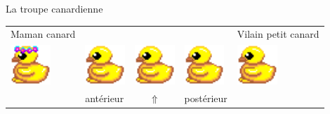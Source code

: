 \documentclass[table]{beamer}
\begin{document}
\begin{frame}{La troupe canardienne}

    \begin{center}
    \begin{tabular}{p{1.5cm}p{1.5cm}c p{1.5cm}p{1.5cm}}
        Maman canard &&&& \footnotesize Vilain petit canard \\
        \includegraphics[width=1.5cm]{img/sprite/ducks/duck_W_1.png} &
        \includegraphics[width=1.5cm]{img/sprite/ducks/duckling_W_1.png} &
        \includegraphics[width=1.5cm]{img/sprite/ducks/duckling_W_1.png} &
        \includegraphics[width=1.5cm]{img/sprite/ducks/duckling_W_1.png} &
        \includegraphics[width=1.5cm]{img/sprite/ducks/duckling_W_1.png} \\
        & antérieur &  $\Uparrow$   & postérieur &
        
    \end{tabular}
    \end{center}

\end{frame}
\end{document}
